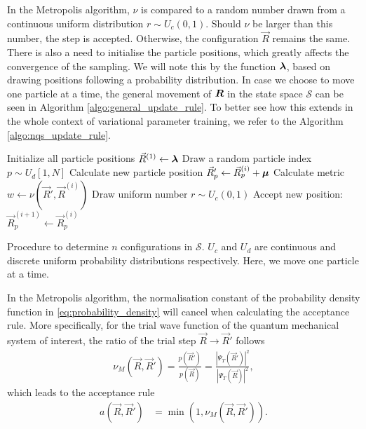 In the Metropolis algorithm, $\nu$ is compared to a random number drawn from a continuous uniform distribution $r \sim U_c(0,1)$. Should $\nu$ be larger than this number, the step is accepted. Otherwise, the configuration $\Vec{R}$ remains the same. There is also a need to initialise the particle positions, which greatly affects the convergence of the sampling. We will note this by the function $\boldsymbol{\lambda}$, based on drawing positions following a probability distribution. In case we choose to move one particle at a time, the general movement of $\boldsymbol{R}$ in the state space $\mathcal{S}$ can be seen in Algorithm \ref{algo:general_update_rule}. To better see how this extends in the whole context of variational parameter training, we refer to the Algorithm \ref{algo:nqs_update_rule}.
\begin{algorithm}[H]
    \begin{algorithmic}
            \STATE Initialize all particle positions $\Vec{R}^{(1)} \leftarrow \boldsymbol{\lambda}$        
                \STATE Draw a random particle index $p \sim U_d[1,N]$ 
                \STATE Calculate new particle position $\Vec{R}'_p \leftarrow \Vec{R}^{(i)}_p + \boldsymbol{\mu}$
                \STATE Calculate metric $w \leftarrow \nu(\Vec{R}', \Vec{R}^{(i)})$  %
                \STATE Draw uniform number $r \sim U_c(0,1) $ 
                    \STATE Accept new position: $\Vec{R}^{(i+1)}_p \leftarrow \Vec{R}^{(i)}_p$ 
                \ENDIF
            \ENDFOR
    \end{algorithmic}
    \caption{Procedure to determine $n$ configurations in $\mathcal{S}$. $U_c$ and $U_d$ are continuous and discrete uniform probability distributions respectively. Here, we move one particle at a time.}
    \label{algo:general_update_rule}
\end{algorithm}

In the Metropolis algorithm, the normalisation constant of the probability density function in \eqref{eq:probability_density} will cancel when calculating the acceptance rule. More specifically, for the trial wave function of the quantum mechanical system of interest, the ratio of the trial step $\Vec{R} \to \Vec{R}'$ follows
\begin{align}
    \nu_{M}(\Vec{R}, \Vec{R}') = \frac{p(\Vec{R}')}{p(\Vec{R})} = \frac{|\Psi_T (\Vec{R}')|^2}{|\Psi_T(\Vec{R})|^2},
    \label{eq:met:metric_metropolis}
\end{align}
which leads to the acceptance rule 
\begin{align}
    a(\Vec{R}, \Vec{R}') &= \min\left(1, \nu_{M}(\Vec{R}, \Vec{R}')\right).
    \label{eq:acceptance_metro_def}
\end{align}

